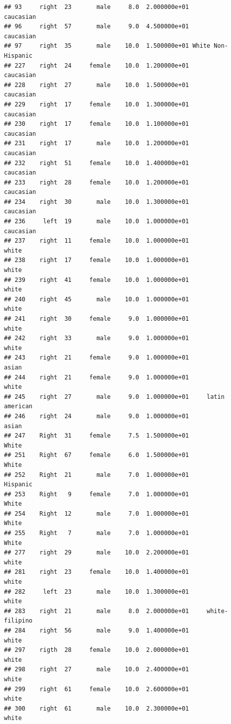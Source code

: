 \documentclass[]{article}
\begin{document}
\begin{verbatim}
## 93     right  23       male     8.0  2.000000e+01          caucasian
## 96     right  57       male     9.0  4.500000e+01          caucasian
## 97     right  35       male    10.0  1.500000e+01 White Non-Hispanic
## 227    right  24     female    10.0  1.200000e+01          caucasian
## 228    right  27       male    10.0  1.500000e+01          caucasian
## 229    right  17     female    10.0  1.300000e+01          caucasian
## 230    right  17     female    10.0  1.100000e+01          caucasian
## 231    right  17       male    10.0  1.200000e+01          caucasian
## 232    right  51     female    10.0  1.400000e+01          caucasian
## 233    right  28     female    10.0  1.200000e+01          caucasian
## 234    right  30       male    10.0  1.300000e+01          caucasian
## 236     left  19       male    10.0  1.000000e+01          caucasian
## 237    right  11     female    10.0  1.000000e+01              white
## 238    right  17     female    10.0  1.000000e+01              white
## 239    right  41     female    10.0  1.000000e+01              white
## 240    right  45       male    10.0  1.000000e+01              white
## 241    right  30     female     9.0  1.000000e+01              white
## 242    right  33       male     9.0  1.000000e+01              white
## 243    right  21     female     9.0  1.000000e+01              asian
## 244    right  21     female     9.0  1.000000e+01              white
## 245    right  27       male     9.0  1.000000e+01     latin american
## 246    right  24       male     9.0  1.000000e+01              asian
## 247    Right  31     female     7.5  1.500000e+01              White
## 251    Right  67     female     6.0  1.500000e+01              White
## 252    Right  21       male     7.0  1.000000e+01           Hispanic
## 253    Right   9     female     7.0  1.000000e+01              White
## 254    Right  12       male     7.0  1.000000e+01              White
## 255    Right   7       male     7.0  1.000000e+01              White
## 277    right  29       male    10.0  2.200000e+01              white
## 281    right  23     female    10.0  1.400000e+01              white
## 282     left  23       male    10.0  1.300000e+01              white
## 283    right  21       male     8.0  2.000000e+01     white-filipino
## 284    right  56       male     9.0  1.400000e+01              white
## 297    rigth  28     female    10.0  2.000000e+01              white
## 298    right  27       male    10.0  2.400000e+01              white
## 299    right  61     female    10.0  2.600000e+01              white
## 300    right  61       male    10.0  2.300000e+01              white

\end{verbatim}
\end{document}
